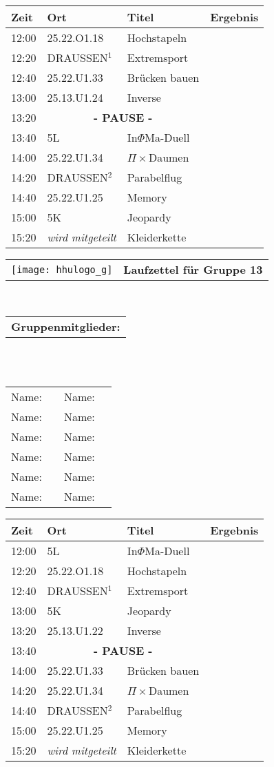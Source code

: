 \documentclass[a4paper,10pt]{article}
\def\spiela{25.22.U1.33 & Brücken bauen}
\def\spielb{DRAUSSEN$^1$ \footnotetext[1]{zwischen 25.22.U1 und 25.13.U1} & Extremsport}
\def\spielc{25.22.O1.18 & Hochstapeln}
\def\spield{5L & In$\Phi $Ma-Duell}
\def\spiele{ 25.13.U1.22 & Inverse}
\def\spielee{ 25.13.U1.24 & Inverse}
\def\spielf{5K & Jeopardy}
\def\spielgg{25.22.U1.25 & Memory}
\def\spielh{DRAUSSEN$^2$ \footnotetext[2]{zwischen 25.22.U1 und 25.33.U1} & Parabelflug}
\def\spieli{ 25.22.U1.34 & $\Pi \times $Daumen}
\def\spielj{\textit{wird mitgeteilt} & Kleiderkette}
\def\pause{\multicolumn{2}{|c|}{\textbf{- PAUSE -}}}
\newcommand{\oben}[1]{

\begin{tabularx}{\textwidth}{lc}
  \texttt{[image: hhulogo\_g]}
& {\Huge \textbf{Laufzettel für Gruppe #1}}
\end{tabularx}
\large
\vspace{0.5cm} \\
\begin{tabularx}{\textwidth}{l}\textbf{Gruppenmitglieder:} \end{tabularx}\\ \phantom{blub}\\
\begin{tabularx}{\textwidth}{p{0.1\textwidth}p{0.4\textwidth}p{0.1\textwidth}p{0.4\textwidth}}
Name: & \underline{\hspace{6cm}} & Name: & \underline{\hspace{6cm}}\\
Name: & \underline{\hspace{6cm}} & Name: & \underline{\hspace{6cm}}\\
Name: & \underline{\hspace{6cm}} & Name: & \underline{\hspace{6cm}}\\
Name: & \underline{\hspace{6cm}} & Name: & \underline{\hspace{6cm}}\\
Name: & \underline{\hspace{6cm}} & Name: & \underline{\hspace{6cm}}\\
Name: & \underline{\hspace{6cm}} & Name: & \underline{\hspace{6cm}}\\
\end{tabularx}



}
\begin{document}
  \LARGE
  \begin{center}
  \vspace{1cm}
  \begin{tabularx}{\textwidth}{p{2.5cm}||p{4.5cm}|p{6.5cm}|l}

  \textbf{Zeit}  & \textbf{Ort} 	&\textbf{Titel} 		& \textbf{Ergebnis} 	\\ \hline \hline

  12:00 &\spielc			&		\\ \hline
  12:20 &\spielb			&		\\ \hline
  12:40 &\spiela			&		\\ \hline

  13:00 &\spielee		 	&		\\ \hline
  13:20 &\pause			&		\\ \hline
  13:40 &\spield			&		\\ \hline

  14:00 &\spieli			&		\\ \hline
  14:20 &\spielh			&		\\ \hline
  14:40 &\spielgg			&		\\ \hline 

  15:00 &\spielf			&		\\ \hline \hline
  15:20 &\spielj			&

  \end{tabularx}
  \end{center}

  \newpage


  \oben{13}

  \LARGE
  \begin{center}
  \vspace{1cm}
  \begin{tabularx}{\textwidth}{p{2.5cm}||p{4.5cm}|p{6.5cm}|l}

  \textbf{Zeit}  & \textbf{Ort} 	&\textbf{Titel} 		& \textbf{Ergebnis} 	\\ \hline \hline

  12:00 &\spield			&		\\ \hline
  12:20 &\spielc			&		\\ \hline
  12:40 &\spielb			&		\\ \hline

  13:00 &\spielf		 	&		\\ \hline
  13:20 &\spiele			&		\\ \hline
  13:40 &\pause			&		\\ \hline

  14:00 &\spiela			&		\\ \hline
  14:20 &\spieli			&		\\ \hline
  14:40 &\spielh			&		\\ \hline 

  15:00 &\spielgg			&		\\ \hline \hline
  15:20 &\spielj			&

  \end{tabularx}
  \end{center}
\end{document}
